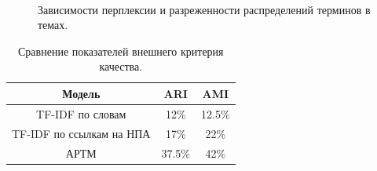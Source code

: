 \documentclass[12pt]{article}
\begin{document}
\begin{figure}[H]
  \\
\caption{Зависимости перплексии и разреженности распределений терминов в темах.}
\label{fg:Example}
\end{figure}

\begin{table}[H]
\caption{\label{tab:summary}Сравнение показателей внешнего критерия качества.}
\begin{center}
\begin{tabular}{|c|c|c|}
\hline
Модель & ARI & AMI\\
\hline
TF-IDF по словам & 12\% & 12.5\% \\
\hline
TF-IDF по ссылкам на НПА & 17\% & 22\% \\
\hline
АРТМ & 37.5\% & 42\% \\
\hline
\end{tabular}
\end{center}
\end{table}
\end{document}
